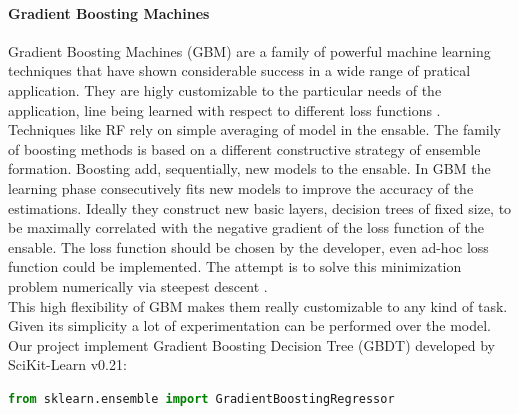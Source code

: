 \documentclass[%
    corpo=12pt,
    twoside,
    oldstyle,
    autoretitolo,
    greek,
    evenboxes,
]{toptesi}
\begin{document}
\paragraph{Gradient Boosting Machines}
Gradient Boosting Machines (GBM) are a family of powerful machine learning techniques that have shown considerable success in a wide range of pratical application. They are higly customizable to the particular needs of the application, line being learned with respect to different loss functions \cite{gbm}. Techniques like RF rely on simple averaging of model in the ensable. The family of boosting methods is based on a different constructive strategy of ensemble formation. Boosting add, sequentially, new models to the ensable. In GBM the learning phase consecutively fits new models to improve the accuracy of the estimations. Ideally they construct new basic layers,  decision trees of fixed size, to be maximally correlated with the negative gradient of the loss function of the ensable. The loss function should be chosen by the developer, even ad-hoc loss function could be implemented. The attempt is to solve this minimization problem numerically via steepest descent \cite{ensable}.\\
This high flexibility of GBM makes them really customizable to any kind of task. Given its simplicity a lot of experimentation can be performed over the model.\\
Our project implement Gradient Boosting Decision Tree (GBDT) developed by SciKit-Learn v0.21:
\begin{lstlisting}[language=Python, frame=single]
  from sklearn.ensemble import GradientBoostingRegressor
\end{lstlisting}
\end{document}
